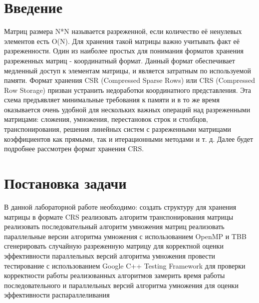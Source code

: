 \documentclass{report}
\begin{document}
\setcounter{page}{2}
\tableofcontents
\newpage

\section* {Введение}
Матриц размера N*N называется разреженной, если количество её ненулевых элементов есть O(N). Для хранения такой матрицы важно учитывать факт её разреженности. Один из наиболее простых для понимания форматов хранения разреженных матриц - координатный формат. Данный формат обеспечивает медленный доступ к элементам матрицы, и является затратным по используемой памяти. Формат хранения CSR (Compressed Sparse Rows) или CRS (Compressed Row Storage) призван устранить недоработки координатного представления. Эта схема предъявляет минимальные требования к памяти и в то же время оказывается очень удобной для нескольких важных операций над разреженными матрицами: сложения, умножения, перестановок строк и столбцов, транспонирования, решения линейных систем с разреженными матрицами коэффициентов как прямыми, так и итерационными методами и т. д. Далее будет подробнее рассмотрен формат хранения CRS.
\newpage
\section* {Постановка задачи}
 В данной лабораторной работе необходимо: \newline{}\quad  создать структуру для хранения матрицы в формате CRS \newline{}\quad  реализовать алгоритм транспонирования матрицы \newline{}\quad реализовать последовательный алгоритм умножения матриц
\newline{}\quad реализовать параллельные версии алгоритма умножения с использованием OpenMP и TBB \newline{}\quad  сгенерировать случайную разреженную матрицу для корректной оценки эффективности параллельных версий алгоритма умножения \newline{}\quad  провести тестирование с использованием Google C++ Testing Framework для проверки корректности работы реализованных алгоритмов \newline{}\quad замерить время работы последовательного и параллельных версий алгоритма умножения для оценки эффективности распараллеливания
\newpage
\end{document}

